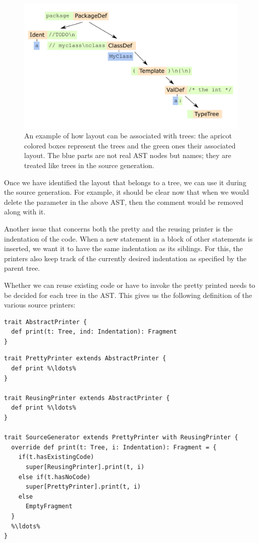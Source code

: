 \begin{figure}
 \centering
 \includegraphics[width=0.8\linewidth]{ast_with_layout.pdf}
 \caption{An example of how layout can be associated with trees: the apricot colored boxes represent the trees and the green ones their associated layout. The blue parts are not real AST nodes but names; they are treated like trees in the source generation.}
 \label{figure:ast_with_layout}
\end{figure}

Once we have identified the layout that belongs to a tree, we can use it during the source generation. For example, it should be clear now that when we would delete the  parameter in the above AST, then the comment would be removed along with it.

Another issue that concerns both the pretty and the reusing printer is the indentation of the code. When a new statement in a block of other statements is inserted, we want it to have the same indentation as its siblings. For this, the printers also keep track of the currently desired indentation as specified by the parent tree. 

Whether we can reuse existing code or have to invoke the pretty printed needs to be decided for each tree in the AST. This gives us the following definition of the various source printers:

\begin{lstlisting}
trait AbstractPrinter {
  def print(t: Tree, ind: Indentation): Fragment
}
\end{lstlisting}
\begin{lstlisting}
trait PrettyPrinter extends AbstractPrinter {
  def print %\ldots%
}

trait ReusingPrinter extends AbstractPrinter {
  def print %\ldots%
}

trait SourceGenerator extends PrettyPrinter with ReusingPrinter {
  override def print(t: Tree, i: Indentation): Fragment = {
    if(t.hasExistingCode)
      super[ReusingPrinter].print(t, i)
    else if(t.hasNoCode)
      super[PrettyPrinter].print(t, i)
    else
      EmptyFragment
  }
  %\ldots%
}
\end{lstlisting}

